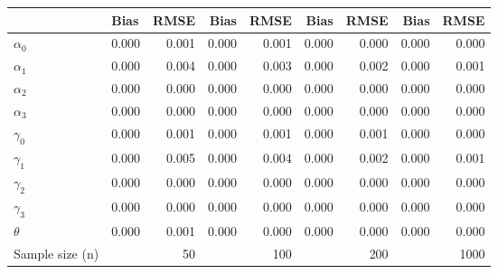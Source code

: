 
\begin{tabular}[t]{llrrrrrrr}
\toprule
  & Bias & RMSE & Bias & RMSE & Bias & RMSE & Bias & RMSE\\
\midrule
$\alpha_{0}$ & 0.000 & 0.001 & 0.000 & 0.001 & 0.000 & 0.000 & 0.000 & 0.000\\
$\alpha_{1}$ & 0.000 & 0.004 & 0.000 & 0.003 & 0.000 & 0.002 & 0.000 & 0.001\\
$\alpha_{2}$ & 0.000 & 0.000 & 0.000 & 0.000 & 0.000 & 0.000 & 0.000 & 0.000\\
$\alpha_{3}$ & 0.000 & 0.000 & 0.000 & 0.000 & 0.000 & 0.000 & 0.000 & 0.000\\
$\gamma_{0}$ & 0.000 & 0.001 & 0.000 & 0.001 & 0.000 & 0.001 & 0.000 & 0.000\\
$\gamma_{1}$ & 0.000 & 0.005 & 0.000 & 0.004 & 0.000 & 0.002 & 0.000 & 0.001\\
$\gamma_{2}$ & 0.000 & 0.000 & 0.000 & 0.000 & 0.000 & 0.000 & 0.000 & 0.000\\
$\gamma_{3}$ & 0.000 & 0.000 & 0.000 & 0.000 & 0.000 & 0.000 & 0.000 & 0.000\\
$\theta$ & 0.000 & 0.001 & 0.000 & 0.000 & 0.000 & 0.000 & 0.000 & 0.000\\
Sample size (n) &  & 50 &  & 100 &  & 200 &  & 1000\\
\bottomrule
\end{tabular}
